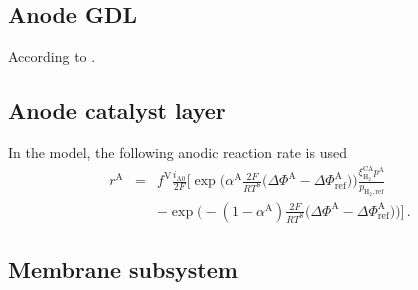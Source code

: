 \documentclass[pdftex,a4paper, 12pt]{article}
\begin{document}
\subsection{Anode GDL}
%
According to \cite{Mangold2010}.
%
%
%
\subsection{Anode catalyst layer}
%
%
In the model, the following anodic reaction rate is used
%
\begin{eqnarray}
	r^{\mathrm{A}} &=& f^{\mathrm{V}} \frac{ i_{\mathrm{A 0}} }{ 2 F} \Big[ \exp \Big( \alpha^{\mathrm{A}} \frac{2 F}{R T^{\mathrm{S}}} \big( \Delta \mathit{\Phi}^{\mathrm{A}} - \Delta \mathit{\Phi}_{\mathrm{ref}}^{\mathrm{A}} \big)\Big) \frac{\xi_{\mathrm{H}_{2}}^{\mathrm{CA}} p^{\mathrm{A}}}{p_{\mathrm{H}_{2}, \mathrm{ref}}} \nonumber \\ 
	&&- \exp \Big( -(1-\alpha^{\mathrm{A}}) \frac{2 F}{R T^{\mathrm{S}}} \big( \Delta \mathit{\Phi}^{\mathrm{A}} - \Delta \mathit{\Phi}_{\mathrm{ref}}^{\mathrm{A}} \big) \Big) \Big] \, .
\end{eqnarray}
%
%
\subsection{Membrane subsystem}
%
\end{document}
